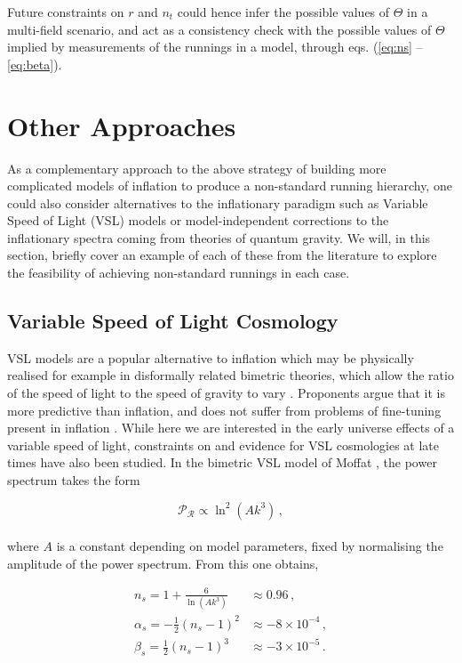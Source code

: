 \documentclass[universe,preprints,oneauthor,pdftex,10pt,a4paper]{mdpi}
\newcommand{\beq}{\begin{equation}}
\newcommand{\eeq}{\end{equation}\\}
\newcommand{\rpar}[1]{\left(#1\right)}
\begin{document}
Future constraints on $r$ and $n_t$ could hence infer the possible values of $\Theta$ in a multi-field scenario, and act as a consistency check with the possible values of $\Theta$ implied by measurements of the runnings in a model, through eqs. (\ref{eq:ns} -- \ref{eq:beta}).

\section{Other Approaches}

As a complementary approach to the above strategy of building more complicated models of inflation to produce a non-standard running hierarchy, one could also consider alternatives to the inflationary paradigm such as Variable Speed of Light (VSL) \cite{Moffat:1992ud} models or model-independent corrections to the inflationary spectra coming from theories of quantum gravity. We will, in this section, briefly cover an example of each of these from the literature to explore the feasibility of achieving non-standard runnings in each case.

\subsection{Variable Speed of Light Cosmology}

VSL models are a popular alternative to inflation which may be physically realised for example in disformally related bimetric theories, which allow the ratio of the speed of light to the speed of gravity to vary \cite{Afshordi:2016guo,Moffat:2004qs,Magueijo:2003gj}. Proponents argue that it is more predictive than inflation, and does not suffer from problems of fine-tuning present in inflation \cite{Moffat:2002nm}. While here we are interested in the early universe effects of a variable speed of light, constraints on and evidence for VSL cosmologies at late times \cite{vandeBruck:2016cnh,Salzano:2016pny} have also been studied. In the bimetric VSL model of Moffat \cite{Moffat:2004qs,Moffat:2013nsa}, the power spectrum takes the form

\beq
\mathcal{P}_\mathcal{R} \propto  \ln^2 \rpar{A k^3} \, ,
\eeq

where $A$ is a constant depending on model parameters, fixed by normalising the amplitude of the power spectrum. From this one obtains,

\begin{align}
n_s = 1 + \frac{6}{\ln \rpar{A k^3}} & \approx 0.96 \, , \\
\alpha_s = -\frac{1}{2} \rpar{n_s-1}^2 & \approx -8 \times 10^{-4}  \, ,\\
\beta_s = \frac{1}{2} \rpar{n_s -1}^3 & \approx -3 \times 10^{-5} \, .
\end{align}
\end{document}
